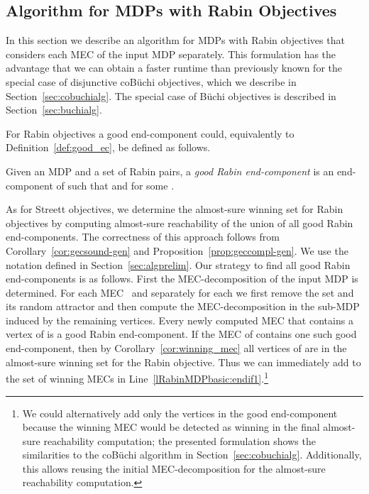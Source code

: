 \documentclass[11pt,letterpaper]{article}
\begin{document}
\subsection{Algorithm for MDPs with Rabin Objectives}
In this section we describe an algorithm for MDPs with Rabin objectives that 
considers each MEC of the input MDP separately. This formulation has the 
advantage that we can obtain a faster runtime than previously known 
for the special case of disjunctive coB{\"u}chi objectives, which we describe in
Section~\ref{sec:cobuchialg}. The special case of B{\"u}chi objectives is 
described in Section~\ref{sec:buchialg}.

For Rabin objectives a good end-component could, equivalently to 
Definition~\ref{def:good_ec}, be defined as follows.
\begin{definition}\label{def:good_rabin_ec}
  Given an MDP  and a set  of 
  Rabin pairs, 
  a \emph{good Rabin end-component} is an end-component  of  such that
   and   for some 
  .
\end{definition}
As for Streett objectives, we determine the almost-sure winning set for Rabin 
objectives by computing almost-sure reachability of the union of all good Rabin 
end-components. The correctness of this approach
follows from Corollary~\ref{cor:gecsound-gen} and Proposition~\ref{prop:geccompl-gen}.
We use the notation defined in Section~\ref{sec:algprelim}.
Our strategy to find all good Rabin end-components is as follows. First the
MEC-decomposition of the input MDP  is determined. For each MEC~
and separately for each  we first remove the set  and its
random attractor and then compute the MEC-decomposition in the sub-MDP induced
by the remaining vertices. Every newly computed MEC that contains a vertex of 
is a good Rabin end-component. If the MEC  of  contains one such 
good end-component, then by Corollary~\ref{cor:winning_mec} all vertices of 
are in the almost-sure winning set for the Rabin objective. Thus we can immediately
add  to the set of winning MECs in Line~\ref{lRabinMDPbasic:endif1}.\footnote{
We could alternatively add only the vertices in the good end-component because
the winning MEC would be detected as winning in the final almost-sure reachability
computation; the presented formulation shows the similarities
to the coB{\"u}chi algorithm in Section~\ref{sec:cobuchialg}. Additionally, this 
allows reusing the initial MEC-decomposition for the almost-sure reachability
computation.}
\end{document}
